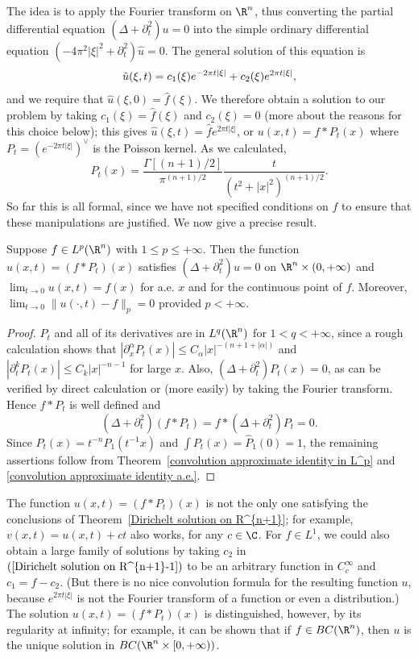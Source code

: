 The idea is to apply the Fourier transform on $\R^n$, thus converting the partial differential equation $(\Delta+\partial_t^2)u=0$ into the simple ordinary differential equation $(-4\pi^2|\xi|^2+\partial_t^2)\hat{u}=0$. The general solution of this equation is
\begin{align}\label{Dirichelt solution on R^{n+1}-1}
\hat{u}(\xi,t)=c_1(\xi)e^{-2\pi t|\xi|}+c_2(\xi)e^{2\pi t|\xi|},
\end{align}
and we require that $\hat{u}(\xi,0)=\hat{f}(\xi)$. We therefore obtain a solution to our problem by taking $c_1(\xi)=\hat{f}(\xi)$ and $c_2(\xi)=0$ (more about the reasons for this choice below); this gives $\hat{u}(\xi,t)=\hat{f}e^{2\pi t|\xi|}$, or $u(x,t)=f\ast P_t(x)$ where $P_t=(e^{-2\pi t|\xi|})^{\vee}$ is the Poisson kernel. As we calculated,
\[P_t(x)=\frac{\Gamma[(n+1)/2]}{\pi^{(n+1)/2}}\frac{t}{(t^2+|x|^2)^{(n+1)/2}}.\]
So far this is all formal, since we have not specified conditions on $f$ to ensure that these manipulations are justified. We now give a precise result.
\begin{theorem}\label{Dirichelt solution on R^{n+1}}
Suppose $f\in L^p(\R^n)$ with $1\leq p\leq+\infty$. Then the function $u(x,t)=(f\ast P_t)(x)$ satisfies $(\Delta+\partial_t^2)u=0$ on $\R^n\times(0,+\infty)$ and $\lim_{t\to 0}u(x,t)=f(x)$ for a.e. $x$ and for the continuous point of $f$. Moreover, $\lim_{t\to 0}\|u(\cdot,t)-f\|_p=0$ provided $p<+\infty$.
\end{theorem}
\begin{proof}
$P_t$ and all of its derivatives are in $L^q(\R^n)$ for $1<q<+\infty$, since a rough calculation shows that $|\partial^\alpha_xP_t(x)|\leq C_\alpha|x|^{-(n+1+|\alpha|)}$ and $|\partial^k_tP_t(x)|\leq C_k|x|^{-n-1}$ for large $x$. Also, $(\Delta+\partial_t^2)P_t(x)=0$, as can be verified by direct calculation or (more easily) by taking the Fourier transform. Hence $f\ast P_t$ is well defined and 
\[(\Delta+\partial_t^2)(f\ast P_t)=f\ast(\Delta+\partial_t^2)P_t=0.\]
Since $P_t(x)=t^{-n}P_1(t^{-1}x)$ and $\int P_t(x)=\hat{P}_1(0)=1$, the remaining assertions follow from Theorem~\ref{convolution approximate identity in L^p} and \ref{convolution approximate identity a.e.}.
\end{proof}
The function $u(x,t)=(f\ast P_t)(x)$ is not the only one satisfying the conclusions of Theorem~\ref{Dirichelt solution on R^{n+1}}; for example, $v(x,t)=u(x,t)+ct$ also works, for any $c\in\C$. For $f\in L^1$, we could also obtain a large family of solutions by taking $c_2$ in $(\ref{Dirichelt solution on R^{n+1}-1})$ to be an arbitrary function in $C^\infty_c$ and $c_1=f-c_2$. (But there is no nice convolution formula for the resulting function $u$, because $e^{2\pi t|\xi|}$ is not the Fourier transform of a function or even a distribution.) The solution $u(x,t)=(f\ast P_t)(x)$ is distinguished, however, by its regularity at infinity; for example, it can be shown that if $f\in BC(\R^n)$, then $u$ is the unique solution in $BC(\R^n\times[0,+\infty))$.\par
